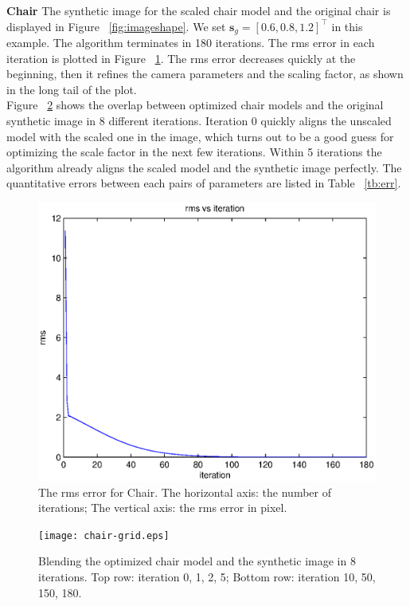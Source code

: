 \documentclass[10pt,twocolumn,letterpaper]{article}
\begin{document}
\noindent
\textbf{Chair} The synthetic image for the scaled chair model and the original chair is displayed in Figure ~\ref{fig:imageshape}. We set $\mathbf{s}_g=[0.6, 0.8, 1.2]^\top$ in this example. The algorithm terminates in 180 iterations. The rms error in each iteration is plotted in Figure ~\ref{fig:chairplot}. The rms error decreases quickly at the beginning, then it refines the camera parameters and the scaling factor, as shown in the long tail of the plot.\\

\noindent
Figure ~\ref{fig:chairgrid} shows the overlap between optimized chair models and the original synthetic image in 8 different iterations. Iteration 0 quickly aligns the unscaled model with the scaled one in the image, which turns out to be a good guess for optimizing the scale factor in the next few iterations. Within 5 iterations the algorithm already aligns the scaled model and the synthetic image perfectly. The quantitative errors between each pairs of parameters are listed in Table ~\ref{tb:err}.

\begin{figure}[t]
\begin{center}
	\includegraphics[scale=0.55]{chair-figure.eps}
\end{center}
	\caption{The rms error for Chair. The horizontal axis: the number of iterations; The vertical axis: the rms error in pixel.}
\label{fig:chairplot}
\end{figure}

\begin{figure}
\begin{center}
	\texttt{[image: chair-grid.eps]}
\end{center}
   \caption{Blending the optimized chair model and the synthetic image in 8 iterations. Top row: iteration 0, 1, 2, 5; Bottom row: iteration 10, 50, 150, 180.}
\label{fig:chairgrid}
\end{figure}
\end{document}
